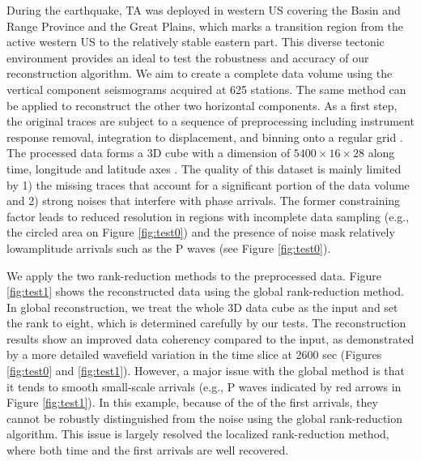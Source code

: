 During the earthquake, TA was deployed in western US covering the Basin and Range Province and the Great Plains, which marks a transition region from the active western US to the relatively stable eastern part.  This diverse tectonic environment provides an ideal  to test the robustness and accuracy of our reconstruction algorithm.  We aim to create a complete data volume using the vertical component seismograms acquired at 625 stations. The same method can be applied to reconstruct the other two horizontal components. As a first step, the original traces are subject to a sequence of preprocessing including instrument response removal, integration to displacement, and binning onto a regular grid . The processed data forms a 3D cube with a dimension of $5400\times 16\times 28$ along time, longitude and latitude axes .  The quality of this dataset is mainly limited by 1) the missing traces that account for a significant portion of the data volume and 2) strong noises that interfere with  phase arrivals.  The former constraining factor leads to  reduced resolution in regions with incomplete data sampling (e.g., the circled area on Figure \ref{fig:test0}) and the presence of noise  mask relatively low\wen{-}amplitude arrivals such as the P waves (see Figure \ref{fig:test0}).

We apply the two rank-reduction methods to the preprocessed data.  Figure \ref{fig:test1} shows the reconstructed data using the global rank-reduction method. In global reconstruction, we treat the whole 3D data cube as the input and set the  rank to eight, which is determined carefully by our tests. The reconstruction results show an improved data coherency compared to the input, as demonstrated by a more detailed wavefield variation in the time slice at 2600 sec (Figures \ref{fig:test0} and \ref{fig:test1}). However, a major issue with the global method is that it tends to smooth small-scale arrivals (e.g., P waves indicated by red arrows in Figure \ref{fig:test1}).  In this example, because of the  of the first arrivals, they cannot be robustly distinguished from the noise using the global rank-reduction algorithm.  This issue is largely resolved  the localized rank-reduction method, where both time  and the first arrivals are well recovered. 

